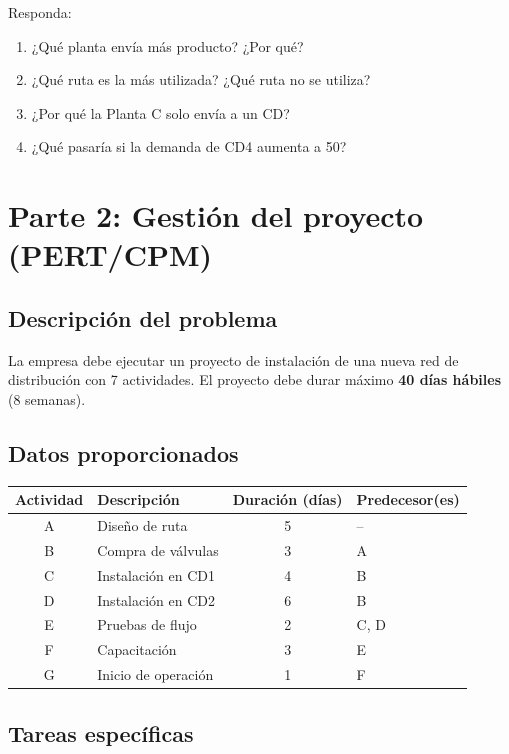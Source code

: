 \documentclass[12pt,a4paper]{article}
\begin{document}
	Responda:
	
	\begin{enumerate}
		\item ¿Qué planta envía más producto? ¿Por qué?
		\item ¿Qué ruta es la más utilizada? ¿Qué ruta no se utiliza?
		\item ¿Por qué la Planta C solo envía a un CD?
		\item ¿Qué pasaría si la demanda de CD4 aumenta a 50?
	\end{enumerate}
	
	\newpage
	
	\section{Parte 2: Gestión del proyecto (PERT/CPM)}
	
	\subsection{Descripción del problema}
	
	La empresa debe ejecutar un proyecto de instalación de una nueva red de distribución con 7 actividades. El proyecto debe durar máximo \textbf{40 días hábiles} (8 semanas).
	
	\subsection{Datos proporcionados}
	
	\begin{table}[H]
		\centering
		\begin{tabular}{|c|l|c|l|}
			\hline
			\textbf{Actividad} & \textbf{Descripción} & \textbf{Duración (días)} & \textbf{Predecesor(es)} \\
			\hline
			A & Diseño de ruta & 5 & -- \\
			B & Compra de válvulas & 3 & A \\
			C & Instalación en CD1 & 4 & B \\
			D & Instalación en CD2 & 6 & B \\
			E & Pruebas de flujo & 2 & C, D \\
			F & Capacitación & 3 & E \\
			G & Inicio de operación & 1 & F \\
			\hline
		\end{tabular}
	\end{table}
	
	\subsection{Tareas específicas}
	
\end{document}
